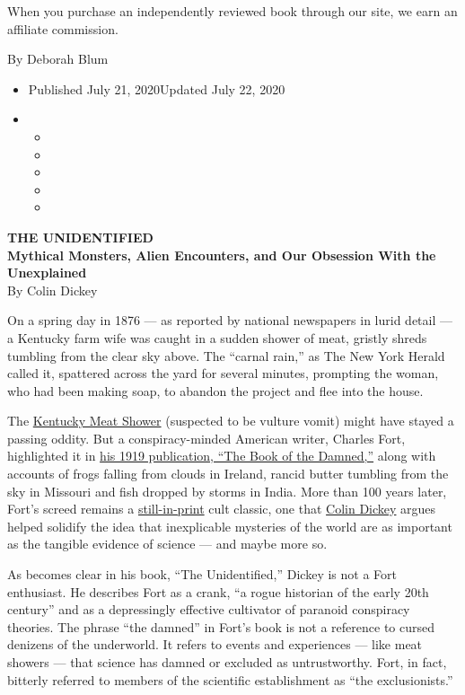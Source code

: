 When you purchase an independently reviewed book through our site, we
earn an affiliate commission.

By Deborah Blum

\begin{itemize}
\item
  Published July 21, 2020Updated July 22, 2020
\item
  \begin{itemize}
  \item
  \item
  \item
  \item
  \item
  \end{itemize}
\end{itemize}

\textbf{THE UNIDENTIFIED}\\
\textbf{Mythical Monsters, Alien Encounters, and Our Obsession With the
Unexplained}\\
By Colin Dickey

On a spring day in 1876 --- as reported by national newspapers in lurid
detail --- a Kentucky farm wife was caught in a sudden shower of meat,
gristly shreds tumbling from the clear sky above. The ``carnal rain,''
as The New York Herald called it, spattered across the yard for several
minutes, prompting the woman, who had been making soap, to abandon the
project and flee into the house.

The
\href{https://blogs.scientificamerican.com/running-ponies/the-great-kentucky-meat-shower-mystery-unwound-by-projectile-vulture-vomit/}{Kentucky
Meat Shower} (suspected to be vulture vomit) might have stayed a passing
oddity. But a conspiracy-minded American writer, Charles Fort,
highlighted it in
\href{https://www.sacred-texts.com/fort/damn/index.htm}{his 1919
publication, ``The Book of the Damned,''} along with accounts of frogs
falling from clouds in Ireland, rancid butter tumbling from the sky in
Missouri and fish dropped by storms in India. More than 100 years later,
Fort's screed remains a
\href{https://www.penguinrandomhouse.com/books/533872/the-book-of-the-damned-by-charles-fort/}{still-in-print}
cult classic, one that \href{http://www.colindickey.com/books}{Colin
Dickey} argues helped solidify the idea that inexplicable mysteries of
the world are as important as the tangible evidence of science --- and
maybe more so.

As becomes clear in his book, ``The Unidentified,'' Dickey is not a Fort
enthusiast. He describes Fort as a crank, ``a rogue historian of the
early 20th century'' and as a depressingly effective cultivator of
paranoid conspiracy theories. The phrase ``the damned'' in Fort's book
is not a reference to cursed denizens of the underworld. It refers to
events and experiences --- like meat showers --- that science has damned
or excluded as untrustworthy. Fort, in fact, bitterly referred to
members of the scientific establishment as ``the exclusionists.''

